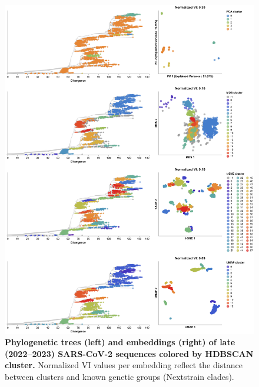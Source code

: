 \documentclass[10pt,letterpaper]{article}
\begin{document}
\begin{figure}[!h]
\includegraphics[width=\columnwidth]{figures/sarscov2-test-embeddings-by-cluster-vs-Nextstrain_clade.png}
\caption{{\bf Phylogenetic trees (left) and embeddings (right) of late (2022--2023) SARS-CoV-2 sequences colored by HDBSCAN cluster.}
  Normalized VI values per embedding reflect the distance between clusters and known genetic groups (Nextstrain clades).
}
\label{fig:sars-cov-2-2022-2023-clusters-vs-Nextstrain-clade}
\end{figure}
\end{document}
